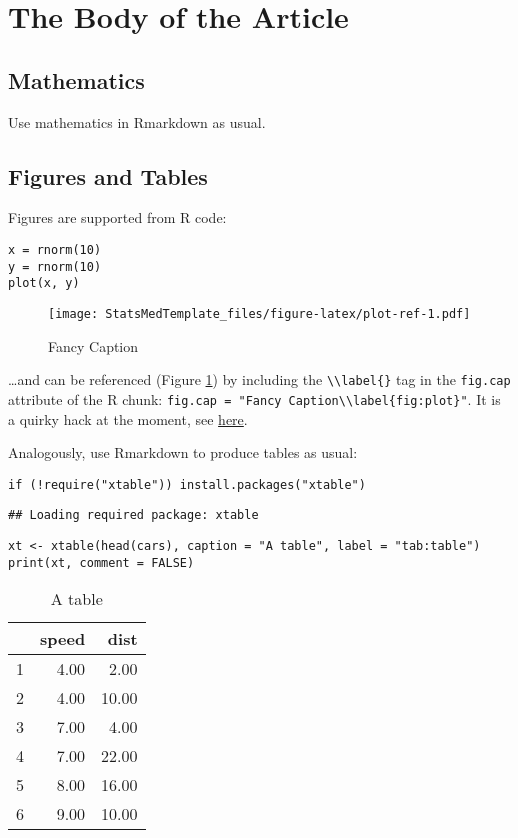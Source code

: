 \documentclass[AMA,STIX1COL,]{WileyNJD-v2}
\begin{document}
\section{The Body of the Article}\label{the-body-of-the-article}

\subsection{Mathematics}\label{mathematics}

Use mathematics in Rmarkdown as usual.

\subsection{Figures and Tables}\label{figures-and-tables}

Figures are supported from R code:

\begin{verbatim}
x = rnorm(10)
y = rnorm(10)
plot(x, y)
\end{verbatim}

\begin{figure}
\centering
\texttt{[image: StatsMedTemplate\_files/figure-latex/plot-ref-1.pdf]}
\caption{Fancy Caption\label{fig:plot}}
\end{figure}

\ldots{}and can be referenced (Figure \ref{fig:plot}) by including the
\texttt{\textbackslash{}\textbackslash{}label\{\}} tag in the
\texttt{fig.cap} attribute of the R chunk:
\texttt{fig.cap\ =\ "Fancy\ Caption\textbackslash{}\textbackslash{}label\{fig:plot\}"}.
It is a quirky hack at the moment, see
\href{https://github.com/yihui/knitr/issues/323}{here}.

Analogously, use Rmarkdown to produce tables as usual:

\begin{verbatim}
if (!require("xtable")) install.packages("xtable")
\end{verbatim}

\begin{verbatim}
## Loading required package: xtable
\end{verbatim}

\begin{verbatim}
xt <- xtable(head(cars), caption = "A table", label = "tab:table")
print(xt, comment = FALSE)
\end{verbatim}

\begin{table}[ht]
\centering
\begin{tabular}{rrr}
  \hline
 & speed & dist \\ 
  \hline
1 & 4.00 & 2.00 \\ 
  2 & 4.00 & 10.00 \\ 
  3 & 7.00 & 4.00 \\ 
  4 & 7.00 & 22.00 \\ 
  5 & 8.00 & 16.00 \\ 
  6 & 9.00 & 10.00 \\ 
   \hline
\end{tabular}
\caption{A table} 
\label{tab:table}
\end{table}
\end{document}
